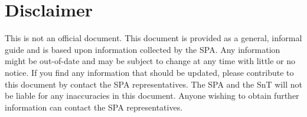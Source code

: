 \section{Disclaimer}
\label{ssec:disclaimer}

This is not an official document. 
This document is provided as a general, informal guide and is based upon information collected by the SPA. 
Any information might be out-of-date and may be subject to change at any time with little or no notice. 
If you find any information that should be updated, please contribute to this document by contact the SPA representatives. 
The SPA and the SnT will not be liable for any inaccuracies in this document. 
Anyone wishing to obtain further information can contact the SPA representatives. 
